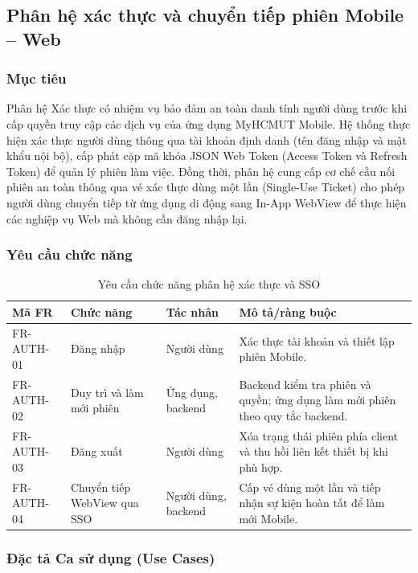 \subsection{Phân hệ xác thực và chuyển tiếp phiên Mobile -- Web}
\label{subsec:req_auth}
\label{subsec:module_auth}

\subsubsection{Mục tiêu}
Phân hệ Xác thực có nhiệm vụ bảo đảm an toàn danh tính người dùng trước khi cấp quyền truy cập các dịch vụ của ứng dụng MyHCMUT Mobile. Hệ thống thực hiện xác thực người dùng thông qua tài khoản định danh (tên đăng nhập và mật khẩu nội bộ), cấp phát cặp mã khóa JSON Web Token (Access Token và Refresh Token) để quản lý phiên làm việc. Đồng thời, phân hệ cung cấp cơ chế cầu nối phiên an toàn thông qua vé xác thực dùng một lần (Single-Use Ticket) cho phép người dùng chuyển tiếp từ ứng dụng di động sang In-App WebView để thực hiện các nghiệp vụ Web mà không cần đăng nhập lại.

\subsubsection{Yêu cầu chức năng}

\begin{table}[H]
\centering
\small
\caption{Yêu cầu chức năng phân hệ xác thực và SSO}
\label{tab:fr_auth}
\begin{tabularx}{\textwidth}{|L{1.8cm}|L{3.1cm}|L{2.5cm}|Y|}
\hline
\textbf{Mã FR} & \textbf{Chức năng} & \textbf{Tác nhân} & \textbf{Mô tả/ràng buộc} \\
\hline
FR-AUTH-01 & Đăng nhập & Người dùng & Xác thực tài khoản và thiết lập phiên Mobile. \\
\hline
FR-AUTH-02 & Duy trì và làm mới phiên & Ứng dụng, backend & Backend kiểm tra phiên và quyền; ứng dụng làm mới phiên theo quy tắc backend. \\
\hline
FR-AUTH-03 & Đăng xuất & Người dùng & Xóa trạng thái phiên phía client và thu hồi liên kết thiết bị khi phù hợp. \\
\hline
FR-AUTH-04 & Chuyển tiếp WebView qua SSO & Người dùng, backend & Cấp vé dùng một lần và tiếp nhận sự kiện hoàn tất để làm mới Mobile. \\
\hline
\end{tabularx}
\end{table}

\subsubsection{Đặc tả Ca sử dụng (Use Cases)}

